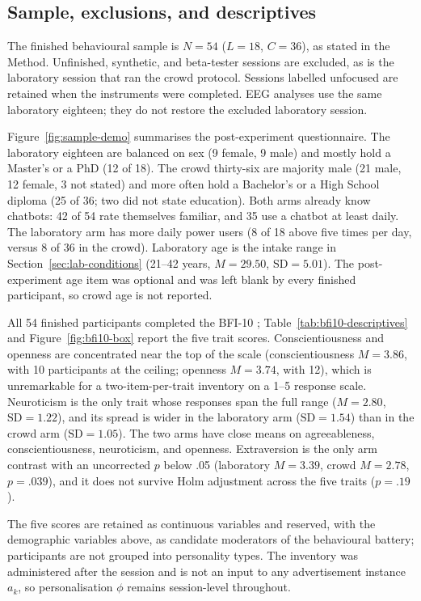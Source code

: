 \documentclass[english]{article}
\begin{document}
\subsection{Sample, exclusions, and descriptives}
\label{sec:results-sample}

The finished behavioural sample is \(N=54\) (\(L=18\), \(C=36\)), as stated in the Method. Unfinished, synthetic, and beta-tester sessions are excluded, as is the laboratory session that ran the crowd protocol. Sessions labelled unfocused are retained when the instruments were completed. EEG analyses use the same laboratory eighteen; they do not restore the excluded laboratory session.

Figure~\ref{fig:sample-demo} summarises the post-experiment questionnaire. The laboratory eighteen are balanced on sex (9 female, 9 male) and mostly hold a Master's or a PhD (12 of 18). The crowd thirty-six are majority male (21 male, 12 female, 3 not stated) and more often hold a Bachelor's or a High School diploma (25 of 36; two did not state education). Both arms already know chatbots: 42 of 54 rate themselves familiar, and 35 use a chatbot at least daily. The laboratory arm has more daily power users (8 of 18 above five times per day, versus 8 of 36 in the crowd). Laboratory age is the intake range in Section~\ref{sec:lab-conditions} (21--42 years, \(M=29.50\), \(\mathrm{SD}=5.01\)). The post-experiment age item was optional and was left blank by every finished participant, so crowd age is not reported.

All 54 finished participants completed the BFI-10 \cite{rammstedt2007bfi10}; Table~\ref{tab:bfi10-descriptives} and Figure~\ref{fig:bfi10-box} report the five trait scores. Conscientiousness and openness are concentrated near the top of the scale (conscientiousness \(M=3.86\), with 10 participants at the ceiling; openness \(M=3.74\), with 12), which is unremarkable for a two-item-per-trait inventory on a 1--5 response scale. Neuroticism is the only trait whose responses span the full range (\(M=2.80\), \(\mathrm{SD}=1.22\)), and its spread is wider in the laboratory arm (\(\mathrm{SD}=1.54\)) than in the crowd arm (\(\mathrm{SD}=1.05\)). The two arms have close means on agreeableness, conscientiousness, neuroticism, and openness. Extraversion is the only arm contrast with an uncorrected \(p\) below .05 (laboratory \(M=3.39\), crowd \(M=2.78\), \(p=.039\)), and it does not survive Holm adjustment across the five traits (\(p=.19\)).

The five scores are retained as continuous variables and reserved, with the demographic variables above, as candidate moderators of the behavioural battery; participants are not grouped into personality types. The inventory was administered after the session and is not an input to any advertisement instance \(a_k\), so personalisation \(\phi\) remains session-level throughout.
\end{document}
